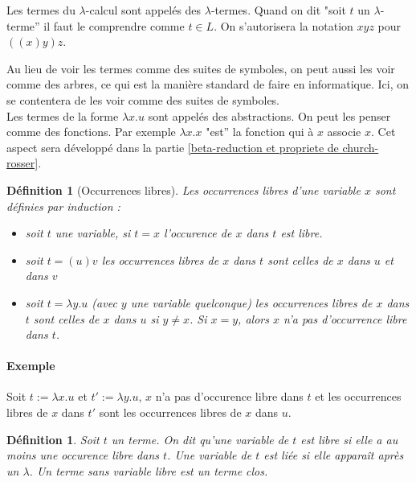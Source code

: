 \documentclass[a4paper,12pt]{article}
\theoremstyle{plain}
\newtheorem{defi}[theo]{Définition}
\begin{document}
Les termes du $\lambda$-calcul sont appelés des $\lambda$-termes. Quand on dit "soit $t$ un $\lambda$-terme'' il faut le comprendre comme $t \in L$. On s'autorisera la notation $xyz$ pour $((x)y)z$.\\ \label{conv parent}

Au lieu de voir les termes comme des suites de symboles, on peut aussi les voir comme des arbres, ce qui est la manière standard de faire en informatique. Ici, on se contentera de les voir comme des suites de symboles.\\

Les termes de la forme $\lambda x . u$ sont appelés des abstractions. On peut les penser comme des fonctions. Par exemple $\lambda x . x$ "est'' la fonction qui à $x$ associe $x$. Cet aspect sera développé dans la partie \ref{beta-reduction et propriete de church-rosser}.

\clearpage

\begin{defi}[Occurrences libres]
Les occurrences libres d'une variable $x$ sont définies par induction :
\begin{itemize}
\setlength\itemsep{ -1.5 em}
\item soit $t$  une variable, si $t=x$ l'occurence de $x$ dans $t$ est libre.\\
\item soit $t = (u)v$ les occurrences libres de $x$ dans $t$ sont celles de $x$ dans $u$ et dans $v$ \\
\item soit $t = \lambda y.u$ (avec $y$ une variable quelconque) les occurrences libres de $x$ dans $t$ sont celles de $x$ dans $u$ si $y \neq x$. Si $x = y$, alors $x$ n'a pas d'occurrence libre dans $t$.
\end{itemize}
\end{defi}

\paragraph{Exemple}
Soit $t := \lambda x.u$ et $t' := \lambda y.u$, $x$ n'a pas d'occurence libre dans $t$ et les occurrences libres de $x$ dans $t'$ sont les occurrences libres de $x$ dans $u$.

\begin{defi}
Soit $t$ un terme. On dit qu'une variable de $t$ est libre si elle a au moins une occurence libre dans $t$. Une variable de $t$ est liée si elle apparaît après un $\lambda$. Un terme sans variable libre est un terme clos.
\end{defi}
\end{document}

